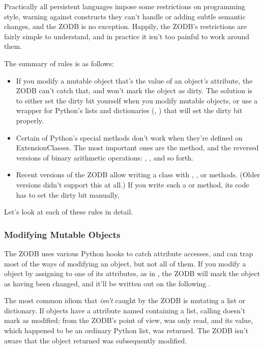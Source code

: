 Practically all persistent languages impose some restrictions on
programming style, warning against constructs they can't handle or
adding subtle semantic changes, and the ZODB is no exception.
Happily, the ZODB's restrictions are fairly simple to understand, and
in practice it isn't too painful to work around them.

The summary of rules is as follows:

\begin{itemize}
\item If you modify a mutable object that's the value of an object's
attribute, the ZODB can't catch that, and won't mark the object as
dirty.  
The solution is to either set the dirty bit yourself when you modify
mutable objects, or use a wrapper for Python's lists and dictionaries
(, 
)
that will set the dirty bit properly.

\item Certain of Python's special methods don't work when they're
defined on ExtensionClasses.  The most important ones are the
 method, and the reversed versions of binary
arithmetic operations: , , and so
forth.

\item Recent versions of the ZODB allow writing a class with 
 , , or  methods.  (Older versions didn't support this at all.)
If you write such a  or  method, 
its code has to set the dirty bit manually, 

\end{itemize}

Let's look at each of these rules in detail.

\subsubsection{Modifying Mutable Objects}

The ZODB uses various Python hooks to catch attribute accesses, and
can trap most of the ways of modifying an object, but not all of them.
If you modify a  object by assigning to one of its
attributes, as in , the ZODB will
mark the object as having been changed, and it'll be written out on
the following .

The most common idiom that \emph{isn't} caught by the ZODB is
mutating a list or dictionary.  If  objects have a
attribute named  containing a list, calling
 doesn't mark
 as modified; from the ZODB's point of
view,  was only read, and its value, which
happened to be an ordinary Python list, was returned.  The ZODB isn't
aware that the object returned was subsequently modified.

